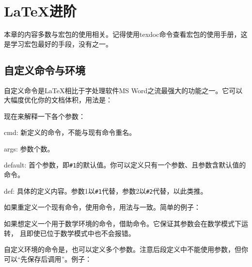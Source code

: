 \clearpage
\chapter{\LaTeX{}进阶}

本章的内容多数与宏包的使用相关。记得使用texdoc命令查看宏包的使用手册，这是学习宏包最好的手段，没有之一。

\section{自定义命令与环境}
\label{sec:newcommand}
自定义命令是\LaTeX 相比于字处理软件MS Word之流最强大的功能之一。它可以大幅度优化你的文档体积，用法是：

现在来解释一下各个参数：
\begin{para}
\item[cmd:] 新定义的命令，不能与现有命令重名。
\item[args:] 参数个数。
\item[default:] 首个参数，即\texttt{\#{}1}的默认值。你可以定义只有一个参数、且参数含默认值的命令。
\item[def:] 具体的定义内容。参数1以\texttt{\#{}1}代替，参数2以\texttt{\#{}2}代替，以此类推。
\end{para}

如果重定义一个现有命令，使用命令，用法与一致。简单的例子：
\begin{latex}
\newcommand{\concept}[1]{\textbf{#1}}
\newcommand{\cop}[2][]{\textbf{#2}}}
\end{latex}

如果想定义一个用于数学环境的命令，借助命令。它保证其参数会在数学模式下运转， 且即使已位于数学模式中也不会报错。
\begin{latex}
\renewcommand\qedsymbol{\ensuremath{\Box}}
\end{latex}

自定义环境的命令是，也可以定义多个参数。注意后段定义中不能使用参数，但你可以“先保存后调用”。例子：
\begin{latex}
\newenvironment{QuoteEnv}[2][]
    {\newcommand\Qauthor{#1}\newcommand\Qref{#2}}
    {\medskip\begin{flushright}\small ——~\Qauthor\\
    \emph{\Qref}\end{flushright}}
\end{latex}

